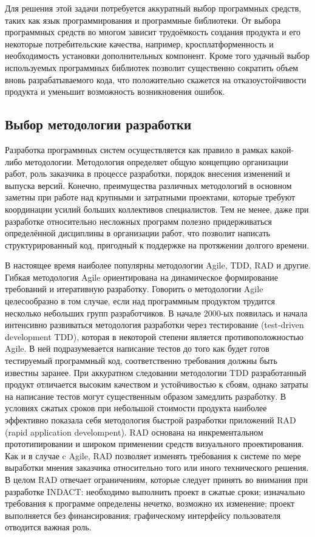 \documentclass[12pt]{diploma}
\begin{document}
	Для решения этой задачи потребуется аккуратный выбор программных средств, таких как язык программирования и программные библиотеки. От выбора программных средств во многом зависит трудоёмкость создания продукта и его некоторые потребительские качества, например, кросплатформенность и необходимость установки дополнительных компонент. Кроме того удачный выбор используемых программных библиотек позволит существенно сократить объем вновь разрабатываемого кода, что положительно скажется на отказоустойчивости продукта и уменьшит  возможность возникновения ошибок. 
	
	\subsection{Выбор методологии разработки}
	Разработка программных систем осуществляется как правило в рамках какой-либо методологии. Методология определяет общую концепцию организации работ, роль заказчика в процессе разработки, порядок внесения изменений и выпуска версий. Конечно, преимущества различных методологий в основном заметны при работе над крупными и затратными проектами, которые требуют координации усилий больших коллективов специалистов. Тем не менее, даже при разработке относительно несложных программ полезно придерживаться определённой дисциплины в организации работ, что позволит написать структурированный код, пригодный к поддержке на протяжении долгого времени.
	
	В настоящее время наиболее популярны методологии Agile, TDD, RAD и другие. Гибкая методология Agile ориентирована на динамическое формирование требований и итеративную разработку. Говорить о методологии  Agile целесообразно в том случае, если над программным продуктом трудится несколько небольших групп разработчиков. В начале 2000-ых появилась и начала интенсивно развиваться методология разработки через тестирование (test-driven development TDD), которая в некоторой степени является противоположностью Agile. В ней подразумевается написание тестов до того как будет готов тестируемый программный код, соответственно требования должны быть известны заранее. При аккуратном следовании методологии TDD разработанный продукт отличается высоким качеством и устойчивостью к сбоям, однако затраты на написание тестов могут существенным образом замедлить разработку. В условиях сжатых сроков при небольшой стоимости продукта наиболее эффективно показала себя методология быстрой разработки приложений RAD (rapid application develompent). RAD основана на инкрементальном прототипировании и широком применении средств визуального проектирования. Как и в случае c Agile, RAD позволяет изменять требования к системе по мере выработки мнения заказчика относительно того или иного технического решения. В целом RAD отвечает ограничениям, которые следует принять во внимания при разработке INDACT: необходимо выполнить проект в сжатые сроки; изначально требования к программе определены  нечетко, возможно их изменение; проект выполняется без финансирования; графическому интерфейсу пользователя отводится важная роль.
\end{document}
